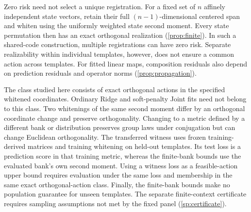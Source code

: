 Zero risk need not select a unique registration.
For a fixed set of $n$ affinely independent state vectors,
retain their full $(n-1)$-dimensional centered span and
whiten using the uniformly weighted state second moment.
Every state permutation then has an exact orthogonal
realization (\cref{prop:finite}).
In such a shared-code construction, multiple registrations
can have zero risk.
Separate realizability within individual templates,
however, does not ensure a common action across templates.
For fitted linear maps, composition residuals also depend
on prediction residuals and operator norms
(\cref{prop:propagation}).

The class studied here consists of exact orthogonal actions
in the specified whitened coordinates.
Ordinary Ridge and soft-penalty Joint fits need not belong
to this class.
Two whitenings of the same second moment differ by an
orthogonal coordinate change and preserve orthogonality.
Changing to a metric defined by a different bank or
distribution preserves group laws under conjugation but
can change Euclidean orthogonality.
The transferred witness uses frozen training-derived
matrices and training whitening on held-out templates.
Its test loss is a prediction score in that training metric,
whereas the finite-bank bounds use the evaluated bank's
own second moment.
Using a witness loss as a feasible-action upper bound
requires evaluation under the same loss and membership in
the same exact orthogonal-action class.
Finally, the finite-bank bounds make no population guarantee
for unseen templates.
The separate finite-context certificate requires sampling
assumptions not met by the fixed panel
(\cref{sp:certificate}).
